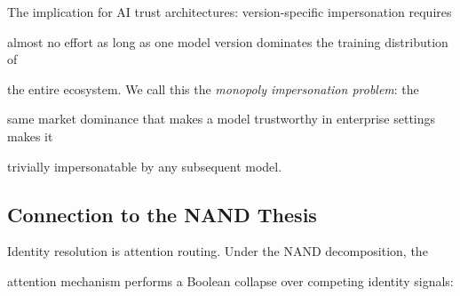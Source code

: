 \documentclass[11pt]{article}
\theoremstyle{definition}
\begin{document}
The implication for AI trust architectures: version-specific impersonation requires





almost no effort as long as one model version dominates the training distribution of





the entire ecosystem. We call this the \emph{monopoly impersonation problem}: the





same market dominance that makes a model trustworthy in enterprise settings makes it





trivially impersonatable by any subsequent model.











\subsection{Connection to the NAND Thesis}











Identity resolution is attention routing. Under the NAND decomposition, the





attention mechanism performs a Boolean collapse over competing identity signals:
\end{document}
